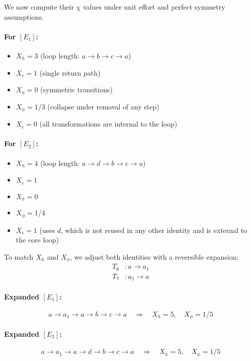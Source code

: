 We now compute their $\chi$ values under unit effort and perfect symmetry assumptions.

\paragraph{For $[E_1]$:}
\begin{itemize}
  \item $X_h = 3$ \quad (loop length: $a \rightarrow b \rightarrow c \rightarrow a$)
  \item $X_c = 1$ \quad (single return path)
  \item $X_\pi = 0$ \quad (symmetric transitions)
  \item $X_\phi = 1/3$ \quad (collapse under removal of any step)
  \item $X_\epsilon = 0$ \quad (all transformations are internal to the loop)
\end{itemize}

\paragraph{For $[E_2]$:}
\begin{itemize}
  \item $X_h = 4$ \quad (loop length: $a \rightarrow d \rightarrow b \rightarrow c \rightarrow a$)
  \item $X_c = 1$
  \item $X_\pi = 0$
  \item $X_\phi = 1/4$
  \item $X_\epsilon = 1$ \quad (uses $d$, which is not reused in any other identity and is external to the core loop)
\end{itemize}

To match $X_h$ and $X_\phi$, we adjust both identities with a reversible expansion:
\begin{align*}
    T_6 &: a \rightarrow a_1 \\
    T_7 &: a_1 \rightarrow a
\end{align*}

\paragraph{Expanded $[E_1]$:}
\[
a \rightarrow a_1 \rightarrow a \rightarrow b \rightarrow c \rightarrow a
\quad \Rightarrow \quad X_h = 5, \quad X_\phi = 1/5
\]

\paragraph{Expanded $[E_2]$:}
\[
a \rightarrow a_1 \rightarrow a \rightarrow d \rightarrow b \rightarrow c \rightarrow a
\quad \Rightarrow \quad X_h = 5, \quad X_\phi = 1/5
\]

